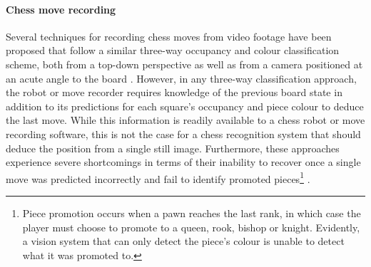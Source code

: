 \documentclass[../../main.tex]{subfiles}
\begin{document}
\paragraph{Chess move recording}
Several techniques for recording chess moves from video footage have been proposed that follow a similar three-way occupancy and colour classification scheme, both from a top-down perspective \cite{sokic2008,wang2013} as well as from a camera positioned at an acute angle to the board \cite{hack2014}.
However, in any three-way classification approach, the robot or move recorder requires knowledge of the previous board state in addition to its predictions for each square's occupancy and piece colour to deduce the last move. 
While this information is readily available to a chess robot or move recording software, this is not the case for a chess recognition system that should deduce the position from a single still image.
Furthermore, these approaches experience severe shortcomings in terms of their inability to recover once a single move was predicted incorrectly and fail to identify promoted pieces\footnote{Piece promotion occurs when a pawn reaches the last rank, in which case the player must choose to promote to a queen, rook, bishop or knight. Evidently, a vision system that can only detect the piece's colour is unable to detect what it was promoted to.} \cite{cour2002}.
\end{document}
